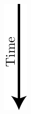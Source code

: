 \begin{figure}[htbp]
\begin{subfigure}[t]{.04\linewidth}
  \includegraphics[width=\linewidth]{figures/arrow.pdf}

\end{subfigure}
\end{figure}
